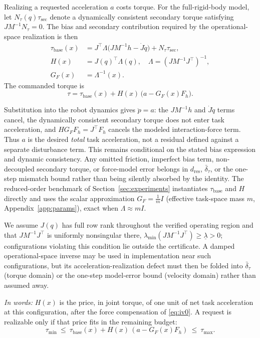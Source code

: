 \documentclass[journal]{IEEEtran}
\begin{document}
Realizing a requested acceleration $a$ costs torque. For the full-rigid-body model, let $N_\tau(q)\tau_{\mathrm{sec}}$ denote a dynamically consistent secondary torque satisfying $JM^{-1}N_\tau=0$. The bias and secondary contribution required by the operational-space realization is then
\begin{align}
\tau_{\mathrm{base}}(x)
&=J^\top\Lambda\bigl(JM^{-1}h-\dot J\dot q\bigr)
+N_\tau\tau_{\mathrm{sec}}, \nonumber\\
H(x)&=J(q)^\top\Lambda(q),
\quad
\Lambda=\left(JM^{-1}J^\top\right)^{-1}, \nonumber\\
G_F(x)&=\Lambda^{-1}(x).
\label{eq:iv0}
\end{align}
The commanded torque is
\begin{equation}
\tau=\tau_{\mathrm{base}}(x)+H(x)\,\bigl(a-G_F(x)F_h\bigr).
\label{eq:iv0a}
\end{equation}

Substitution into the robot dynamics gives $\ddot p=a$: the $JM^{-1}h$ and $\dot J\dot q$ terms cancel, the dynamically consistent secondary torque does not enter task acceleration, and $HG_FF_h=J^\top F_h$ cancels the modeled interaction-force term. Thus $a$ is the desired \emph{total} task acceleration, not a residual defined against a separate disturbance term. This remains conditional on the stated bias expression and dynamic consistency. Any omitted friction, imperfect bias term, non-decoupled secondary torque, or force-model error belongs in $d_{\mathrm{res}}$, $\bar\delta_\tau$, or the one-step mismatch bound rather than being silently absorbed by the identity. The reduced-order benchmark of Section~\ref{sec:experiments} instantiates $\tau_{\mathrm{base}}$ and $H$ directly and uses the scalar approximation $G_F=\tfrac1m I$ (effective task-space mass $m$, Appendix~\ref{app:params}), exact when $\Lambda\approx mI$.

We assume $J(q)$ has full row rank throughout the verified operating region and that $JM^{-1}J^\top$ is uniformly nonsingular there, $\lambda_{\min}(JM^{-1}J^\top)\ge\underline\lambda>0$; configurations violating this condition lie outside the certificate. A damped operational-space inverse may be used in implementation near such configurations, but its acceleration-realization defect must then be folded into $\bar\delta_\tau$ (torque domain) or the one-step model-error bound (velocity domain) rather than assumed away.

\emph{In words:} $H(x)$ is the price, in joint torque, of one unit of net task acceleration at this configuration, after the force compensation of \eqref{eq:iv0}. A request is realizable only if that price fits in the remaining budget:
\begin{equation}
\tau_{\min}\ \le\ \tau_{\mathrm{base}}(x)+H(x)\,(a-G_F(x)F_h)\ \le\ \tau_{\max}.
\label{eq:iv1}
\end{equation}
\end{document}
